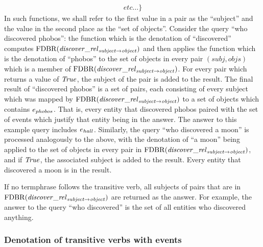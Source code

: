 \documentclass[../main.tex]{subfiles}
\begin{document}
\begin{refsection}
\begin{multline*}
	\mathit{etc} \ldots \}
\end{multline*}
In such functions, we shall refer to the first value in a pair as the ``subject'' and the value in
the second place as the ``set of objects''.
Consider the query ``who discovered phobos'': the function which is the denotation
of ``discovered'' computes $\mathrm{FDBR}({\mathit{discover\_rel}_{\mathit{subject} \rightarrow \mathit{object}}})$ and then applies the function which is the
denotation of ``phobos'' to the set of objects in every pair $(\mathit{subj}, \mathit{objs})$ which is a member of
$\mathrm{FDBR}({\mathit{discover\_rel}_{\mathit{subject} \rightarrow \mathit{object}}})$. For every pair which returns a value of $\mathit{True}$, the subject of the pair is added to
the result. The final result of ``discovered
phobos'' is a set of pairs, each consisting of every subject which was mapped by $\mathrm{FDBR}({\mathit{\mathit{discover}\_rel}_{\mathit{subject} \rightarrow \mathit{object}}})$
to a set of objects which contains $e_{phobos}$. That is, every entity that discovered phobos paired with the set of events which justify that entity being in the answer. The
answer to this example query includes $e_{hall}$. Similarly, the query ``who discovered a moon'' is
processed analogously to the above, with the denotation of ``a moon'' being applied to the set of
objects in every pair in $\mathrm{FDBR}({\mathit{\mathit{discover}\_rel}_{\mathit{subject} \rightarrow \mathit{object}}})$, and if $\mathit{True}$, the associated subject is added to
the result. Every entity that discovered a moon is in the result.

If no termphrase follows the transitive verb, all subjects of pairs that are in
$\mathrm{FDBR}({\mathit{discover\_rel}_{\mathit{subject} \rightarrow \mathit{object}}})$ are returned as the answer. For example, the answer to the query
``who discovered'' is the set of all entities who discovered anything.

\subsubsection{Denotation of transitive verbs with events}
\label{ext:transevents}


\end{refsection}
\end{document}
